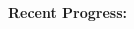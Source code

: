\documentclass[12pt]{article}
\begin{document}
\begin{multicols}{2}
\raggedright

\paragraph{Recent Progress:}
\begin{comment}
		\itemsep0em 
		\item Added to global g and VTS:
		\begin{minipage}{\linewidth}
						\begin{itemize}
				\itemsep0em 
						\footnotesize
							\item ivmmod
							\item pwrmod
						\end{itemize}
				\end{minipage}
		\item\href{https://github.com/thadhaines/MT-Tech-SETO/blob/master/researchDocs/TEX/one-offs/200804-VTSexplained/200804-VTSexplained.pdf}{Updated VTS documentation}
		\item\href{https://github.com/thadhaines/MT-Tech-SETO/blob/master/researchDocs/TEX/one-offs/200806-ExtendedVersionComp/200806-ExtendedVersionComp.pdf}{Created 4 minute simulation showing VTS is $\approx$14x faster than PST 3.1.1}
		\item\href{https://github.com/thadhaines/MT-Tech-SETO/blob/master/researchDocs/TEX/one-offs/200806-ExtendedVTSdetail/200806-ExtendedVTSdetail.pdf}{Created a document showing possible VTS switching issues.}
		\item `Single Time Block' idea tested - not viable due to MATLAB solver operations.
		\item \href{https://github.com/thadhaines/MT-Tech-SETO/blob/master/researchDocs/TEX/one-offs/200709-PSTsetoVersionChanges/200709-PSTsetoVersionChanges.pdf}{Updated pst SETO change doc}
		\item \href{https://github.com/thadhaines/MT-Tech-SETO/blob/master/researchDocs/TEX/one-offs/200811-IVMwithVTS/200811-IVMwithVTS.pdf}{Tested IVM in VTS, created result doc.}


\paragraph{Action Items From Sandia:}
	\begin{itemize}
		\itemsep 0em 
			\item Run long term simulation to show benefits of VTS.
	\end{itemize}


\end{comment}
\end{multicols}
\end{document}
